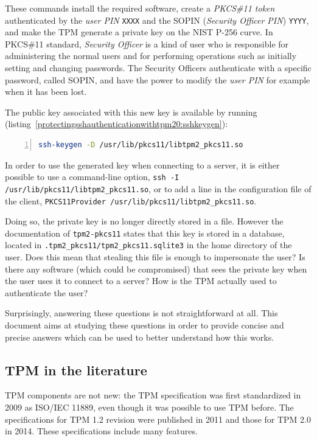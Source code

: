 These commands install the required software, create a \emph{PKCS\#11
token} authenticated by the \emph{user PIN}
\texttt{XXXX} and the SOPIN (\emph{Security Officer
PIN}) \texttt{YYYY}, and make the TPM generate a
private key on the NIST P-256 curve. In PKCS\#11 standard,
\emph{Security Officer} is a kind of user who is responsible for
administering the normal users and for performing operations such as
initially setting and changing passwords. The Security Officers
authenticate with a specific password, called SOPIN, and have the power
to modify the \emph{user PIN} for example when it has been lost.

The public key associated with this new key is available by running
(listing~\ref{protectingsshauthenticationwithtpm20:sshkeygen}):

\begin{lstlisting}[language=sh, numbers=left, caption={Command to query the public parts of keys stored on a TPM}, label=protectingsshauthenticationwithtpm20:sshkeygen]
ssh-keygen -D /usr/lib/pkcs11/libtpm2_pkcs11.so
\end{lstlisting}

In order to use the generated key when connecting to a server, it is
either possible to use a command-line option,
\texttt{ssh -I /usr/lib/pkcs11/libtpm2\_pkcs11.so}, or
to add a line in the configuration file of the client,
\texttt{PKCS11Provider /usr/lib/pkcs11/libtpm2\_pkcs11.so}.

Doing so, the private key is no longer directly stored in a file.
However the documentation of \texttt{tpm2-pkcs11}
states that this key is stored in a database, located in
\texttt{.tpm2\_pkcs11/tpm2\_pkcs11.sqlite3} in the home
directory of the user. Does this mean that stealing this file is enough
to impersonate the user? Is there any software (which could be
compromised) that sees the private key when the user uses it to connect
to a server? How is the TPM actually used to authenticate the user?

Surprisingly, answering these questions is not straightforward at all.
This document aims at studying these questions in order to provide
concise and precise answers which can be used to better understand how
this works.

\subsection{TPM in the literature}

TPM components are not new: the TPM specification was first standardized
in 2009 as ISO/IEC 11889, even though it was possible to use TPM before.
The specifications for TPM 1.2 revision were published in 2011 and those
for TPM 2.0 in 2014. These specifications include many features.

